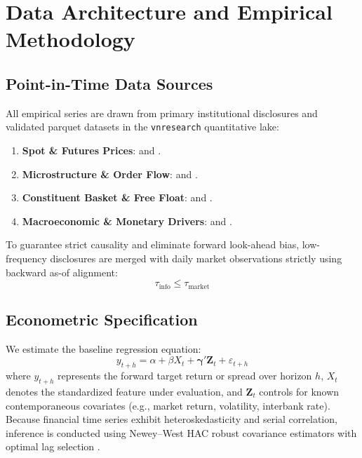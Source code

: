 \documentclass{article}
\begin{document}
\section{Data Architecture and Empirical Methodology}
\label{sec:data_methods}

\subsection{Point-in-Time Data Sources}
All empirical series are drawn from primary institutional disclosures and validated parquet datasets in the \texttt{vnresearch} quantitative lake:
\begin{enumerate}
    \item \textbf{Spot \& Futures Prices}:  and .
    \item \textbf{Microstructure \& Order Flow}:  and .
    \item \textbf{Constituent Basket \& Free Float}:  and .
    \item \textbf{Macroeconomic \& Monetary Drivers}:  and .
\end{enumerate}

To guarantee strict causality and eliminate forward look-ahead bias, low-frequency disclosures are merged with daily market observations strictly using backward as-of alignment:
\begin{equation}
    \tau_{\text{info}} \le \tau_{\text{market}}
\end{equation}

\subsection{Econometric Specification}
We estimate the baseline regression equation:
\begin{equation}
    y_{t+h} = \alpha + \beta X_t + \boldsymbol{\gamma}' \mathbf{Z}_t + \varepsilon_{t+h}
    \label{eq:baseline}
\end{equation}
where $y_{t+h}$ represents the forward target return or spread over horizon $h$, $X_t$ denotes the standardized feature under evaluation, and $\mathbf{Z}_t$ controls for known contemporaneous covariates (e.g., market return, volatility, interbank rate). Because financial time series exhibit heteroskedasticity and serial correlation, inference is conducted using Newey--West HAC robust covariance estimators with optimal lag selection \citep{newey1987simple}.
\end{document}

